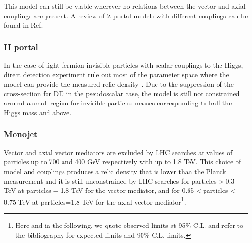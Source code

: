This model can still be viable wherever no relations between the vector and axial couplings are present. A review of Z portal models with different couplings can be found in Ref.~\cite{Arcadi:2014lta}. 


\subsubsection{H portal}

In the case of light fermion invisible particles with scalar couplings to the Higgs, direct detection experiment rule out most of the parameter space where the model can provide the measured relic density~\cite{Escudero:2016gzx,Djouadi:2011aa}. Due to the suppression of the cross-section for DD in the pseudoscalar case, the model is still not constrained around a small region for invisible particles masses corresponding to half the Higgs mass and above. %

\subsubsection{Monojet}

Vector and axial vector mediators are excluded by LHC searches at values of \mdm particles up to 700 and 400 GeV respectively with \mmed up to 1.8 TeV. This choice of model and couplings produces a relic density that is lower than the Planck measurement and it is still unconstrained by LHC searches for \mdm particles$>$0.3 TeV at \mdm particles$=$1.8 TeV for the vector mediator, and for 0.65$<$\mdm particles$<$0.75 TeV at \mdm particles=1.8 TeV for the axial vector mediator\footnote{Here and in the following, we quote observed limits at 95\% C.L. and refer to the bibliography for expected limits and 90\% C.L. limits.}. 

